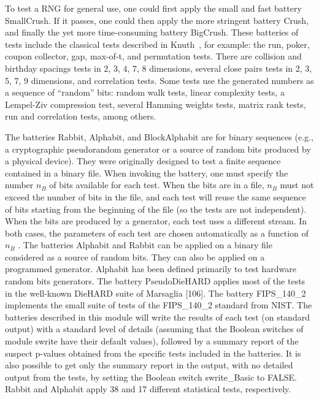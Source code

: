To test a RNG for general use,
one could first apply the small and fast battery SmallCrush. If it passes, one could then apply
the more stringent battery Crush, and finally the yet more time-consuming battery BigCrush.
These batteries of tests include the classical tests described in Knuth~\cite{Knuth1998}, for
example: the run, poker, coupon collector, gap, max-of-t, and permutation tests.
There are collision and birthday spacings tests in 2, 3, 4, 7, 8 dimensions, several close pairs tests in 2, 3, 5, 7, 9 dimensions, and correlation tests. Some
tests use the generated numbers as a sequence of ``random'' bits: random walk
tests, linear complexity tests, a Lempel-Ziv compression test, several Hamming
weights tests, matrix rank tests, run and correlation tests, among others.




The batteries Rabbit, Alphabit, and BlockAlphabit are for binary sequences
(e.g., a cryptographic pseudorandom generator or a source of random bits
produced by a physical device). They were originally designed to test a finite
sequence contained in a binary file. When invoking the battery, one must specify the number $n_B$ of bits available for each test. When the bits are in a file, $n_B$
must not exceed the number of bits in the file, and each test will reuse the same
sequence of bits starting from the beginning of the file (so the tests are not independent). When the bits are produced by a generator, each test uses a different
stream. In both cases, the parameters of each test are chosen automatically as
a function of $n_B$ .
The batteries Alphabit and Rabbit can be applied on a binary file considered as a source
of random bits. They can also be applied on a programmed generator. Alphabit has been
defined primarily to test hardware random bits generators. The battery PseudoDieHARD
applies most of the tests in the well-known DieHARD suite of Marsaglia [106]. The battery
FIPS\_140\_2 implements the small suite of tests of the FIPS\_140\_2 standard from NIST.
The batteries described in this module will write the results of each test (on standard
output) with a standard level of details (assuming that the Boolean switches of module
swrite have their default values), followed by a summary report of the suspect p-values
obtained from the specific tests included in the batteries. It is also possible to get only the
summary report in the output, with no detailed output from the tests, by setting the Boolean
switch swrite\_Basic to FALSE. Rabbit and Alphabit apply 38 and 17 different statistical tests,
respectively. 

